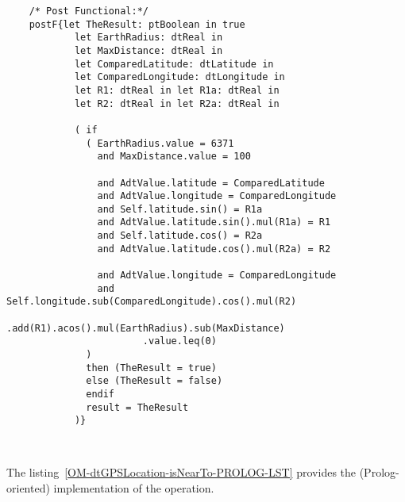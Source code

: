 	\scriptsize
	\vspace{0.5cm}
	\begin{lstlisting}[style=MessirStyle,firstnumber=auto,captionpos=b,caption={\msrmessir (MCL-oriented) specification of the operation \emph{isNearTo}.},label=OM-dtGPSLocation-isNearTo-MCL-LST]

	
	
	/* Post Functional:*/ 
	postF{let TheResult: ptBoolean in true
	        let EarthRadius: dtReal in
	        let MaxDistance: dtReal in
	        let ComparedLatitude: dtLatitude in
	        let ComparedLongitude: dtLongitude in
	        let R1: dtReal in let R1a: dtReal in
	        let R2: dtReal in let R2a: dtReal in
	        
	        ( if
	          ( EarthRadius.value = 6371
	            and MaxDistance.value = 100
	            
	            and AdtValue.latitude = ComparedLatitude
	            and AdtValue.longitude = ComparedLongitude
	            and Self.latitude.sin() = R1a
	            and AdtValue.latitude.sin().mul(R1a) = R1
	            and Self.latitude.cos() = R2a
	            and AdtValue.latitude.cos().mul(R2a) = R2
	            
	            and AdtValue.longitude = ComparedLongitude
	            and Self.longitude.sub(ComparedLongitude).cos().mul(R2)
	                    .add(R1).acos().mul(EarthRadius).sub(MaxDistance)
	                    .value.leq(0)
	          )
	          then (TheResult = true)
	          else (TheResult = false)
	          endif
	          result = TheResult
	        )}
	
	
	\end{lstlisting}
	\normalsize 
	
	
	
	
	
	\vspace{1cm}
	The listing~\ref{OM-dtGPSLocation-isNearTo-PROLOG-LST} provides the \msrmessir (Prolog-oriented) implementation of the operation.
	
	\scriptsize
	\vspace{0.5cm}
	
	
	\normalsize





